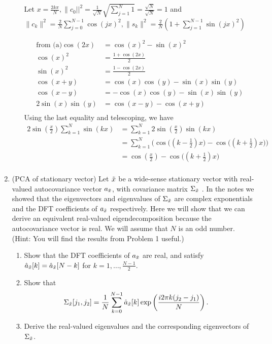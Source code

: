 \documentclass[12pt,twoside]{article}
\begin{document}
\begin{enumerate}
\begin{enumerate}
 Let $x=\frac{2 k \pi}{N}, \|c_0||^2 =  \frac{1}{\sqrt{N}} \sqrt{\sum_{j=1}^N 1} = \frac{\sqrt{N}} {\sqrt{N}} = 1$ 
and $\|c_k\|^2 = \frac{2}{N} \sum_{j=0}^{N-1} \cos(j x)^2, \|s_k\|^2 = \frac{2}{N} (1 + \sum_{j=1}^{N-1} \sin(j x)^2)$
 
 \begin{align*}
 \text{from (a)}	\cos(2 x)		&= \cos(x)^2 - \sin(x)^2 \\
			\cos(x)^2 		&= \frac{1 + \cos(2 x)} {2} \\
			\sin(x)^2		&=  \frac{1 - \cos(2 x)} {2} \\
			\cos(x+y) 		& = \cos(x)\cos(y) - \sin(x)\sin(y)\\
			\cos(x - y)		&= -\cos(x) \cos(y) - \sin(x) \sin(y) \\
			 2 \sin(x) \sin(y)	&= \cos(x - y) - \cos( x+ y) \\
 \end{align*}
 Using the last equality and telescoping, we have 
 \begin{align*}
 		2 \sin(\frac{x}{2}) \sum_{k=1}^N \sin(k x)	&=  \sum_{k=1}^N  2 \sin(\frac{x}{2})  \sin(k x) \\
										&= \sum_{k=1}^N \bigg( \cos \bigg( (k - \frac{1}{2}) x \bigg) -  \cos \bigg( (k + \frac{1}{2}) x \bigg) \bigg) \\
										&= \cos(\frac{x}{2}) - \cos \bigg( (k + \frac{1}{2}) x \bigg) \\
 \end{align*}
 


 \end{enumerate}
  
 \item (PCA of stationary vector) Let $\tilde{  x }$ be a wide-sense stationary vector with real-valued autocovariance vector $a_{\tilde{  x }}$,  with covariance matrix $\Sigma_{\tilde{  x }}$ . In the notes we showed that the eigenvectors and eigenvalues of $\Sigma_{\tilde{  x }}$ are complex exponentials and the DFT coefficients of $a_{\tilde{  x }}$ respectively. Here we will show that we can derive an equivalent real-valued eigendecomposition because the autocovariance vector is real. We will assume that $N$ is an odd number. (Hint: You will find the results from Problem 1 useful.)
 \begin{enumerate}
 \item Show that the DFT coefficients of $a_{\tilde{  x }}$ are real, and satisfy $\hat{a}_{\tilde{  x }}[k] = \hat{a}_{\tilde{  x }}[N-k]$ for $k=1,\ldots,\frac{N-1}{2}$.
 \item Show that
 \begin{align}
 \Sigma_{\tilde{  x }}[j_1,j_2] & = \frac{1}{N}\sum_{k=0}^{N-1} \hat{a}_{\tilde{  x }}[k] \exp\left( \frac{i2 \pi k (j_2-j_1)}{N} \right).
 \end{align}  
  \item Derive the real-valued eigenvalues and the corresponding eigenvectors of $\Sigma_{\tilde{  x }}$.
  \end{enumerate}
 

\end{enumerate}
\end{document}
